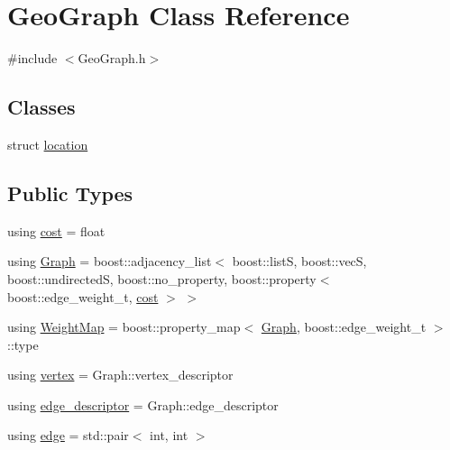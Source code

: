 \hypertarget{class_geo_graph}{}\section{Geo\+Graph Class Reference}
\label{class_geo_graph}


{\ttfamily \#include $<$Geo\+Graph.\+h$>$}

\subsection*{Classes}
\begin{DoxyCompactItemize}
\item 
struct \mbox{\hyperlink{struct_geo_graph_1_1location}{location}}
\end{DoxyCompactItemize}
\subsection*{Public Types}
\begin{DoxyCompactItemize}
\item 
using \mbox{\hyperlink{class_geo_graph_aeab86df7ed72508486bdae447ae14fa7}{cost}} = float
\item 
using \mbox{\hyperlink{class_geo_graph_a4f8c3bf1eb9f30bc227f300d7460debb}{Graph}} = boost\+::adjacency\+\_\+list$<$ boost\+::listS, boost\+::vecS, boost\+::undirectedS, boost\+::no\+\_\+property, boost\+::property$<$ boost\+::edge\+\_\+weight\+\_\+t, \mbox{\hyperlink{class_geo_graph_aeab86df7ed72508486bdae447ae14fa7}{cost}} $>$ $>$
\item 
using \mbox{\hyperlink{class_geo_graph_abc1f115f69f62ae60f5f0f71f7725a96}{Weight\+Map}} = boost\+::property\+\_\+map$<$ \mbox{\hyperlink{class_geo_graph_a4f8c3bf1eb9f30bc227f300d7460debb}{Graph}}, boost\+::edge\+\_\+weight\+\_\+t $>$\+::type
\item 
using \mbox{\hyperlink{class_geo_graph_a24b9a457c1b212d947a891e3e12ea5d2}{vertex}} = Graph\+::vertex\+\_\+descriptor
\item 
using \mbox{\hyperlink{class_geo_graph_a25a89bd71a817e31c8cca4556cdfdb54}{edge\+\_\+descriptor}} = Graph\+::edge\+\_\+descriptor
\item 
using \mbox{\hyperlink{class_geo_graph_a61f1fbc2a1a9272f92f3ab34d8d41f75}{edge}} = std\+::pair$<$ int, int $>$
\end{DoxyCompactItemize}
